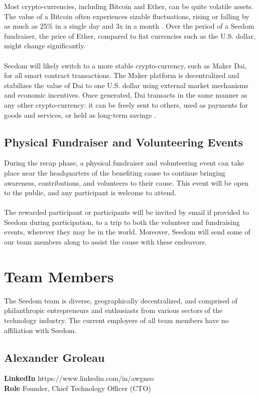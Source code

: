 \documentclass[11pt]{article}
\begin{document}
Most crypto-currencies, including Bitcoin and Ether, can be quite volatile assets. The value of a Bitcoin often experiences sizable fluctuations, rising or falling by as much as 25\% in a single day and 3x in a month \cite{10}. Over the period of a Seedom fundraiser, the price of Ether, compared to fiat currencies such as the U.S. dollar, might change significantly.\\\\
Seedom will likely switch to a more stable crypto-currency, such as Maker Dai, for all smart contract transactions. The Maker platform is decentralized and stabilizes the value of Dai to one U.S. dollar using external market mechanisms and economic incentives. Once generated, Dai transacts in the same manner as any other crypto-currency: it can be freely sent to others, used as payments for goods and services, or held as long-term savings \cite{9}. 

\subsection{Physical Fundraiser and Volunteering Events}

During the recap phase, a physical fundraiser and volunteering event can take place near the headquarters of the benefiting cause to continue bringing awareness, contributions, and volunteers to their cause. This event will be open to the public, and any participant is welcome to attend.\\\\
The rewarded participant or participants will be invited by email if provided to Seedom during participation, to a trip to both the volunteer and fundraising events, wherever they may be in the world. Moreover, Seedom will send some of our team members along to assist the cause with these endeavors.

\section{Team Members}

The Seedom team is diverse, geographically decentralized, and comprised of philanthropic entrepreneurs and enthusiasts from various sectors of the technology industry. The current employers of all team members have no affiliation with Seedom.

\subsection{Alexander Groleau}
\begin{minipage}{\textwidth}
\textbf{LinkedIn} https://www.linkedin.com/in/awgneo\\
\textbf{Role} Founder, Chief Technology Officer (CTO)\\
\end{minipage}
\end{document}
